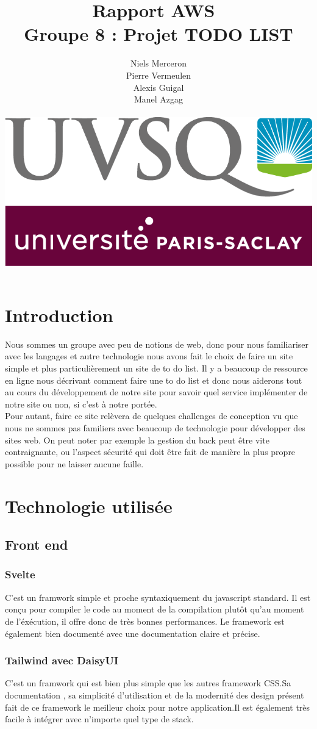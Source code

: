 \documentclass[a4paper,12pt]{report}
\date{}
\title{Rapport AWS \\ Groupe 8 : Projet TODO LIST}
\author{Niels Merceron \\ Pierre Vermeulen \\ Alexis Guigal \\ Manel Azgag \\ \\  \includegraphics[scale=0.20]{logo-UVSQ-2020-RVB.png}}
\begin{document}
\maketitle

\newpage
\tableofcontents
\chapter{Introduction}

Nous sommes un groupe avec peu de notions de web, donc pour nous familiariser avec les langages et autre technologie nous avons fait le choix de faire un site simple et plus particulièrement un site de to do list. Il y a beaucoup de ressource en ligne nous décrivant comment faire une to do list et donc nous aiderons tout au cours du développement de notre site pour savoir quel service implémenter de notre site ou non, si c'est à notre portée.
\\Pour autant, faire ce site relèvera de quelques challenges de conception vu que nous ne sommes pas familiers avec beaucoup de technologie pour développer des sites web.
On peut noter par exemple la gestion du back peut être vite contraignante, ou l'aspect sécurité qui doit être fait de manière la plus propre possible pour ne laisser aucune faille.


\chapter{Technologie utilisée}
\section{Front end}

\subsection{Svelte}
C'est un framwork simple et proche syntaxiquement du javascript standard. Il est conçu pour compiler le code au moment de la compilation plutôt qu'au moment de l'éxécution, il offre donc de très bonnes performances. Le framework est également bien documenté avec une documentation claire et précise.

\subsection{Tailwind avec DaisyUI}
C'est un framwork qui est bien plus simple que les autres framework CSS.Sa documentation , sa simplicité d'utilisation et de la modernité des design présent fait de ce framework le meilleur choix pour notre application.Il est également très facile à intégrer avec n'importe quel type de stack.
\end{document}
